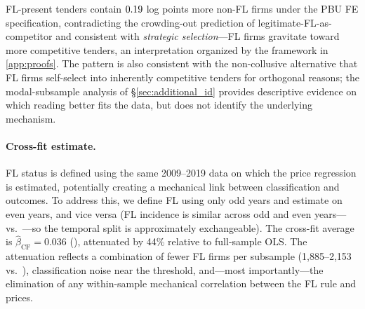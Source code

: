 

FL-present tenders contain $0.19$ log points more non-FL firms
under the PBU FE specification, contradicting the crowding-out
prediction of legitimate-FL-as-competitor and consistent with
\emph{strategic selection}---FL firms gravitate toward more
competitive tenders, an interpretation organized by the
framework in \ref{app:proofs}. The pattern is also consistent
with the non-collusive alternative that FL firms self-select
into inherently competitive tenders for orthogonal reasons;
the modal-subsample analysis of \S\ref{sec:additional_id}
provides descriptive evidence on which reading better fits the
data, but does not identify the underlying mechanism.

\paragraph{Cross-fit estimate.}
FL status is defined using the same 2009--2019 data on which the price
regression is estimated, potentially creating a mechanical link between
classification and outcomes. To address this, we define FL using only odd years and estimate on
even years, and vice versa (FL incidence is similar across odd and
even years---\valPctFiveOne vs.\ \valPctFourFive---so the temporal split is
approximately exchangeable). The cross-fit
average is $\hat{\beta}_{\text{CF}} = 0.036$ (\valPctThreeSix), attenuated by
44\% relative to full-sample OLS. The attenuation reflects a
combination of fewer FL firms per subsample
(1,885--2,153 vs.\ \valFL), classification noise near the threshold,
and---most importantly---the elimination of any within-sample
mechanical correlation between the FL rule and prices.

